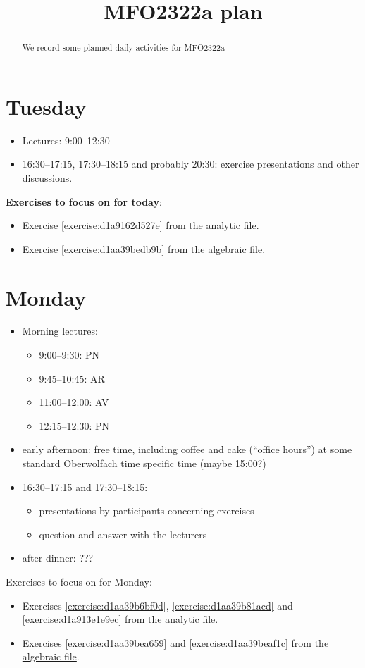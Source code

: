 \documentclass[reqno]{amsart} 
\title{MFO2322a plan}
\begin{document}
\begin{abstract}
  We record some planned daily activities for MFO2322a
\end{abstract}


\section{Tuesday}
\begin{itemize}
\item Lectures: 9:00--12:30
\item 16:30--17:15, 17:30--18:15 and probably 20:30: exercise presentations and other discussions.
\end{itemize}
\textbf{Exercises to focus on for today}:
\begin{itemize}
\item Exercise \ref{exercise:d1a9162d527e} from the \href{20230524T094424__exercises-localized-vectors.pdf}{analytic file}.
\item Exercise \ref{exercise:d1aa39bedb9b} from the \href{20230528T213149__microlocal-algebraic-exercises.pdf}{algebraic file}.
\end{itemize}

\section{Monday}
\begin{itemize}
\item Morning lectures:
  \begin{itemize}
  \item 9:00--9:30: PN
  \item 9:45--10:45: AR
  \item 11:00--12:00: AV
  \item 12:15--12:30: PN
  \end{itemize}
\item early afternoon: free time, including coffee and cake (``office hours'') at some standard Oberwolfach time specific time (maybe 15:00?)
\item 16:30--17:15 and 17:30--18:15:
  \begin{itemize}
  \item presentations by participants concerning exercises
  \item question and answer with the lecturers
  \end{itemize}
\item after dinner: ???
\end{itemize}

Exercises to focus on for Monday:
\begin{itemize}
\item Exercises \ref{exercise:d1aa39b6bf0d}, \ref{exercise:d1aa39b81acd} and \ref{exercise:d1a913e1e9ec} from the \href{20230524T094424__exercises-localized-vectors.pdf}{analytic file}.
\item Exercises \ref{exercise:d1aa39bea659} and \ref{exercise:d1aa39beaf1c} from the \href{20230528T213149__microlocal-algebraic-exercises.pdf}{algebraic file}.
\end{itemize}

{} 
\end{document}
